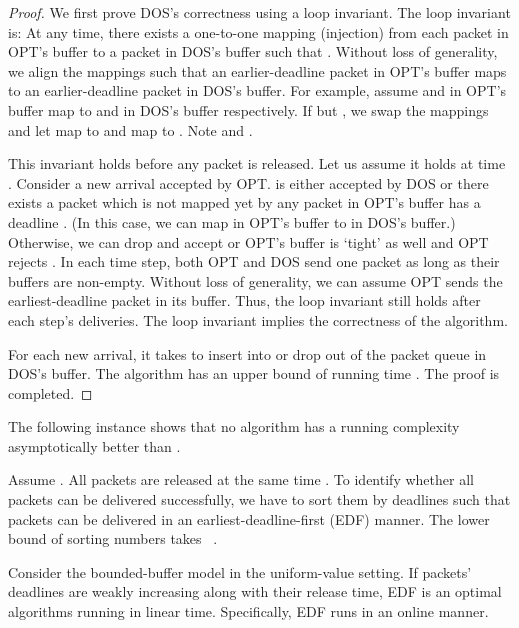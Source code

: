 \documentclass[final, 11pt]{article}
\begin{document}
\begin{proof}
We first prove DOS's correctness using a loop invariant. The loop invariant is: At any time, there exists a one-to-one mapping (injection) from each packet  in OPT's buffer to a packet  in DOS's buffer such that . Without loss of generality, we align the mappings such that an earlier-deadline packet in OPT's buffer maps to an earlier-deadline packet in DOS's buffer. For example, assume  and  in OPT's buffer map to  and  in DOS's buffer respectively. If  but , we swap the mappings and let  map to  and  map to . Note  and .

This invariant holds before any packet is released. Let us assume it holds at time . Consider a new arrival  accepted by OPT.  is either accepted by DOS or there exists a packet  which is not mapped yet by any packet in OPT's buffer has a deadline . (In this case, we can map  in OPT's buffer to  in DOS's buffer.) Otherwise, we can drop  and accept  or OPT's buffer is `tight' as well and OPT rejects . In each time step, both OPT and DOS send one packet as long as their buffers are non-empty. Without loss of generality, we can assume OPT sends the earliest-deadline packet in its buffer. Thus, the loop invariant still holds after each step's deliveries. The loop invariant implies the correctness of the algorithm.

For each new arrival, it takes  to insert  into or drop  out of the packet queue in DOS's buffer. The algorithm has an upper bound of running time . The proof is completed. 
\end{proof}

The following instance shows that no algorithm has a running complexity asymptotically better than .

\begin{Example}
Assume . All packets are released at the same time . To identify whether all packets can be delivered successfully, we have to sort them by deadlines such that packets can be delivered in an earliest-deadline-first (EDF) manner. The lower bound of sorting  numbers takes ~\cite{CLRS01}.
\end{Example}

\begin{corollary}
Consider the bounded-buffer model in the uniform-value setting. If packets' deadlines are weakly increasing along with their release time, EDF is an optimal algorithms running in linear time. Specifically, EDF runs in an online manner.
\end{corollary}
\end{document}
